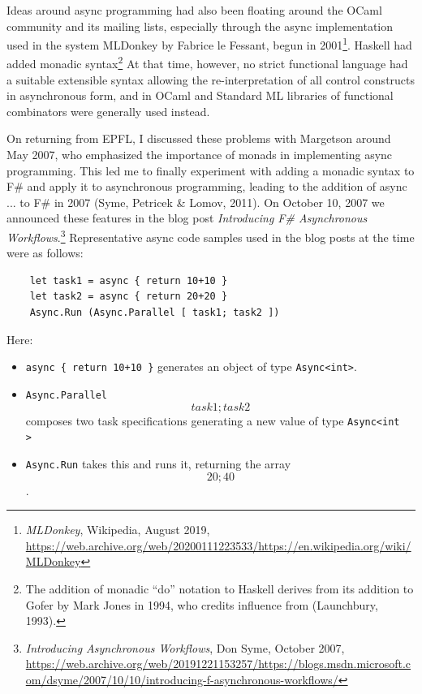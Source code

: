 \documentclass[acmsmall]{acmart}\settopmatter{}
\begin{document}
Ideas around async programming had also been floating around the OCaml community and its mailing lists, especially through the async implementation used in the system MLDonkey by Fabrice le Fessant, begun in 2001\footnote{\textit{MLDonkey}, Wikipedia, August 2019, \url{https://web.archive.org/web/20200111223533/https://en.wikipedia.org/wiki/MLDonkey}}.  Haskell had added monadic syntax\footnote{The addition of  monadic “do” notation to Haskell derives from its addition to Gofer by Mark Jones in 1994, who credits influence from (Launchbury, 1993).} At that time, however,
no strict functional language had a suitable extensible syntax allowing the re-interpretation of all control constructs in asynchronous form, and in
OCaml and Standard ML libraries of functional combinators were generally used instead.  

On returning from EPFL, I discussed these problems with Margetson around May 2007, who emphasized the importance of monads in implementing async programming. This led me to finally experiment with adding a monadic syntax to F\# and apply it to asynchronous programming, leading to the addition of async { ... } to F\# in 2007 (Syme, Petricek \& Lomov, 2011).  On October 10, 2007 we announced these features in the blog post \textit{Introducing F\# Asynchronous Workflows}.\footnote{\textit{Introducing Asynchronous Workflows}, Don Syme, October 2007, \url{https://web.archive.org/web/20191221153257/https://blogs.msdn.microsoft.com/dsyme/2007/10/10/introducing-f-asynchronous-workflows/}}  Representative async code samples used in the blog posts at the time were as follows:

\begin{verbatim}
    let task1 = async { return 10+10 }
    let task2 = async { return 20+20 }
    Async.Run (Async.Parallel [ task1; task2 ])
\end{verbatim}

Here:
\begin{itemize}
\item \texttt{async \{ return 10+10 \}} generates an object of type \texttt{Async<int>}.  
\item \texttt{Async.Parallel \[ task1; task2 \]} composes two task specifications generating a new value of type \texttt{Async<int\[\]>}
\item \texttt{Async.Run} takes this and runs it, returning the array \texttt{\[20; 40\]}. 
\end{itemize}
\end{document}

